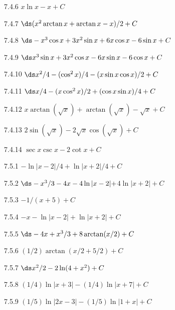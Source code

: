 \begin{Answer}{7.4.6}
 $x\ln x-x +C$
\end{Answer}
\begin{Answer}{7.4.7}
 $\ds (x^2\arctan x +\arctan x -x)/2+C$
\end{Answer}
\begin{Answer}{7.4.8}
 $\ds -x^3\cos x+3x^2\sin x+6x\cos x-6\sin x+C$
\end{Answer}
\begin{Answer}{7.4.9}
 $\ds x^3\sin x+3x^2\cos x-6x\sin x-6\cos x+C$
\end{Answer}
\begin{Answer}{7.4.10}
 $\ds x^2/4-(\cos^2 x)/4-(x\sin x\cos x)/2+C$
\end{Answer}
\begin{Answer}{7.4.11}
 $\ds x/4-(x\cos^2 x)/2+(\cos x\sin x)/4+C$
\end{Answer}
\begin{Answer}{7.4.12}
 $x\arctan(\sqrt x)+\arctan(\sqrt x)-\sqrt{x}+C$
\end{Answer}
\begin{Answer}{7.4.13}
 $2\sin(\sqrt x)-2\sqrt x\cos(\sqrt x)+C$
\end{Answer}
\begin{Answer}{7.4.14}
 $\sec x\csc x-2\cot x+C$
\end{Answer}
\begin{Answer}{7.5.1}
 $-\ln|x-2|/4+\ln|x+2|/4+C$
\end{Answer}
\begin{Answer}{7.5.2}
 $\ds -x^3/3-4x-4\ln|x-2|+$\hfill\break$4\ln|x+2| +C$
\end{Answer}
\begin{Answer}{7.5.3}
 $-1/(x+5) +C$
\end{Answer}
\begin{Answer}{7.5.4}
 $-x-\ln|x-2|+\ln|x+2| +C$
\end{Answer}
\begin{Answer}{7.5.5}
 $\ds -4x+x^3/3+8\arctan(x/2) +C$
\end{Answer}
\begin{Answer}{7.5.6}
 $(1/2)\arctan(x/2+5/2) +C$
\end{Answer}
\begin{Answer}{7.5.7}
 $\ds x^2/2-2\ln(4+x^2) +C$
\end{Answer}
\begin{Answer}{7.5.8}
 $(1/4)\ln|x+3|-(1/4)\ln|x+7| +C$
\end{Answer}
\begin{Answer}{7.5.9}
 $(1/5)\ln|2x-3|-(1/5)\ln|1+x| +C$
\end{Answer}
